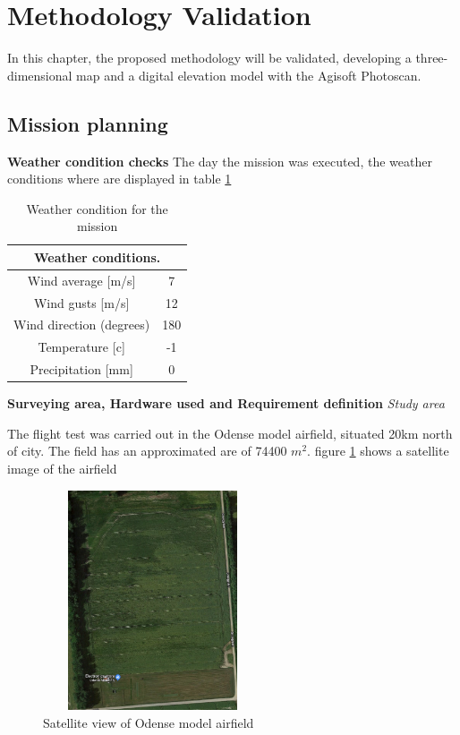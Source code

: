 \section{Methodology Validation}
In this chapter, the proposed methodology will be validated, developing a three-dimensional map and a digital elevation model with the Agisoft Photoscan.
\subsection{Mission planning}
\textbf{Weather condition checks}\newline
The day the mission was executed, the weather conditions where are  displayed in table \ref{Table:Weather}
\begin{table}[H]
\centering
\begin{tabular}{|c|c|}
\hline
\multicolumn{2}{|c|}{Weather conditions.} \\ \hline
Wind average {[}m/s{]}         & 7        \\ \hline
Wind gusts {[}m/s{]}           & 12       \\ \hline
Wind direction (degrees)       & 180      \\ \hline
Temperature {[}c{]}            & -1       \\ \hline
Precipitation {[}mm{]}         & 0        \\ \hline
\end{tabular}
\caption{Weather condition for the mission}
\label{Table:Weather}
\end{table}
\textbf{Surveying area, Hardware used and Requirement definition}\newline
\textit{Study area}

The flight test was carried out in the Odense model airfield, situated 20km north of city. The field has an approximated are of  74400 $m^2$. figure \ref{fig:Airfield} shows a satellite image of the airfield
\begin{figure}[H]
\centering
\includegraphics[width=6.5cm,height=6.5cm,keepaspectratio]{imagenes/Satellite.png}
\caption{Satellite view of Odense model airfield}
\label{fig:Airfield}
\end{figure}


